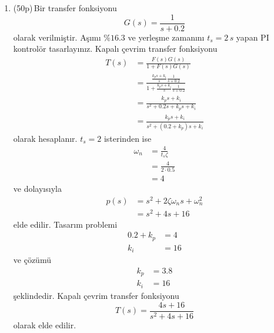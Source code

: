 \begin{enumerate}[\bfseries S1.]
    \item (50p)\,Bir transfer fonksiyonu
    \begin{equation}
        G(s)=\frac{1}{s+0.2}
    \end{equation}
    olarak verilmiştir. Aşımı $\%16.3$ ve yerleşme zamanını $t_s=2\,s$ yapan PI kontrolör tasarlayınız. Kapalı çevrim transfer fonksiyonu
    \begin{equation}
    \begin{split}
        T(s)&=\frac{F(s)G(s)}{1+F(s)G(s)}\\
        &=\frac{\frac{k_ps+k_i}{s}\frac{1}{s+0.2}}{1+\frac{k_ps+k_i}{s}\frac{1}{s+0.2}}\\
        &=\frac{k_ps+k_i}{s^2+0.2s+k_ps+k_i}\\
        &=\frac{k_ps+k_i}{s^2+(0.2+k_p)s+k_i}
    \end{split}
    \end{equation}
    olarak hesaplanır. $t_s=2$ isterinden ise 
    \begin{equation}
    \begin{split}
        \omega_n&=\frac{4}{t_s\zeta}\\
        &=\frac{4}{2\cdot 0.5}\\
        &=4
    \end{split}
    \end{equation}
    ve dolayısıyla
\begin{equation}
\begin{split}
    p(s)&=s^2+2\zeta \omega_n s+\omega_n^2\\
    &=s^2+4s+16
\end{split}
\end{equation}
elde edilir. Tasarım problemi
\begin{equation}
\begin{split}
    0.2+k_p&=4\\
    k_i&=16
\end{split}
\end{equation}
ve çözümü
\begin{equation}
\begin{split}
    k_p&=3.8\\
    k_i&=16
\end{split}
\end{equation}
şeklindedir. Kapalı çevrim transfer fonksiyonu
\begin{equation}
    T(s)=\frac{4s+16}{s^2+4s+16}
\end{equation}
olarak elde edilir.
\end{enumerate}
